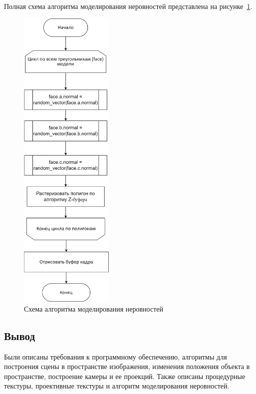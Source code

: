 Полная схема алгоритма моделирования неровностей представлена на  рисунке~\ref{fig:bump}.
\clearpage
\begin{figure}[h]
	\centering
	\includegraphics[width=0.4\textwidth]{img/algorithms/bump.png}
	\caption{Схема алгоритма моделирования неровностей}
	\label{fig:bump}
\end{figure}
\clearpage
\subsection*{Вывод}
Были описаны требования к программному обеспечению, алгоритмы для построения сцены в пространстве изображения, изменения положения объекта в пространстве, построение камеры и ее проекций. Также описаны процедурные текстуры, проективные текстуры и алгоритм моделирования неровностей.